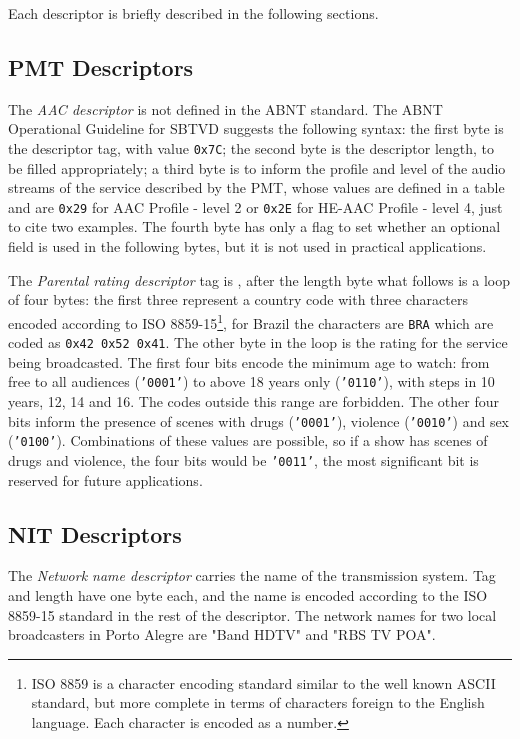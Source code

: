 \documentclass[
	12pt,				%
	openright,			%
	twoside,			%
	a4paper,			%
	brazil,
	french,				%
	english
	]{abntex2}
\begin{document}
Each descriptor is briefly described in the following sections.

\subsection{PMT Descriptors}
\label{pmt_descriptors}
The \textit{AAC descriptor} is not defined in the ABNT standard. The ABNT Operational Guideline for SBTVD suggests the following syntax: the first byte is the descriptor tag, with value \texttt{0x7C}; the second byte is the descriptor length, to be filled appropriately; a third byte is to inform the profile and level of the audio streams of the service described by the PMT, whose values are defined in a table and are \texttt{0x29} for AAC Profile - level 2 or \texttt{0x2E} for HE-AAC Profile - level 4, just to cite two examples. The fourth byte has only a flag to set whether an optional field is used in the following bytes, but it is not used in practical applications.

The \textit{Parental rating descriptor} tag is \texttt{}, after the length byte what follows is a loop of four bytes: the first three represent a country code with three characters encoded according to ISO 8859-15\footnote{ISO 8859 is a character encoding standard similar to the well known ASCII standard, but more complete in terms of characters foreign to the English language. Each character is encoded as a number.}, for Brazil the characters are \texttt{BRA} which are coded as \texttt{0x42 0x52 0x41}. The other byte in the loop is the rating for the service being broadcasted. The first four bits encode the minimum age to watch: from free to all audiences (\texttt{'0001'}) to above 18 years only (\texttt{'0110'}), with steps in 10 years, 12, 14 and 16. The codes outside this range are forbidden. The other four bits inform the presence of scenes with drugs (\texttt{'0001'}), violence (\texttt{'0010'}) and sex (\texttt{'0100'}). Combinations of these values are possible, so if a show has scenes of drugs and violence, the four bits would be \texttt{'0011'}, the most significant bit is reserved for future applications.

\subsection{NIT Descriptors}
\label{nit_descriptors}
The \textit{Network name descriptor} carries the name of the transmission system. Tag and length have one byte each, and the name is encoded according to the ISO 8859-15 standard in the rest of the descriptor. The network names for two local broadcasters in Porto Alegre are "Band HDTV" and "RBS TV POA".
\end{document}

